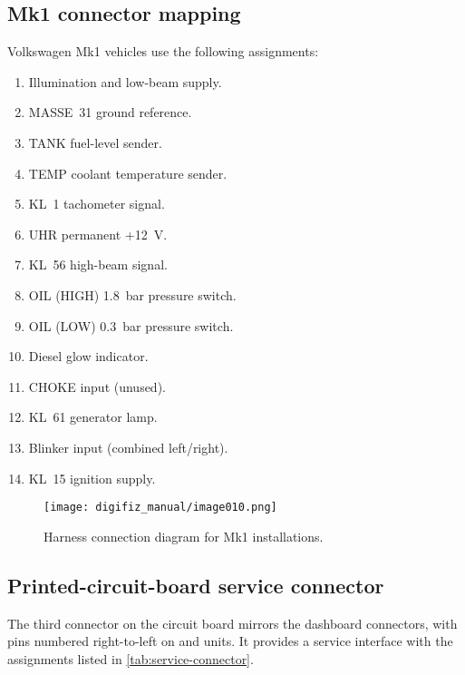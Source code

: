 \subsection{Mk1 connector mapping}
Volkswagen Mk1 vehicles use the following assignments:
\begin{enumerate}
    \item Illumination and low-beam supply.
    \item MASSE~31 ground reference.
    \item TANK fuel-level sender.
    \item TEMP coolant temperature sender.
    \item KL~1 tachometer signal.
    \item UHR permanent +12~V.
    \item KL~56 high-beam signal.
    \item OIL (HIGH) 1.8~bar pressure switch.
    \item OIL (LOW) 0.3~bar pressure switch.
    \item Diesel glow indicator.
    \item CHOKE input (unused).
    \item KL~61 generator lamp.
    \item Blinker input (combined left/right).
    \item KL~15 ignition supply.
\end{enumerate}
\begin{figure}[htbp]
    \centering
    \texttt{[image: digifiz\_manual/image010.png]}
    \caption{Harness connection diagram for Mk1 installations.}
\end{figure}

\subsection{Printed-circuit-board service connector}
The third connector on the circuit board mirrors the dashboard connectors, with pins numbered right-to-left on \ReplicaGenOneShort{} and \ReplicaNextShort{} units. It provides a service interface with the assignments listed in \autoref{tab:service-connector}.


